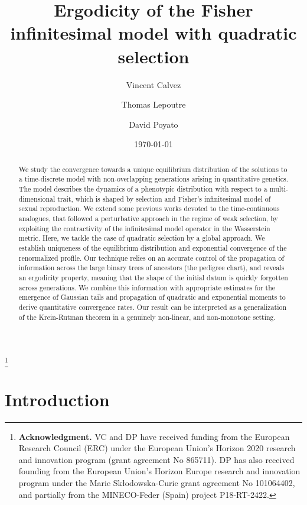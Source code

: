 \documentclass[reqno]{amsart}
\title[Ergodicity of the Fisher infinitesimal model with quadratic selection]{Ergodicity of the Fisher infinitesimal model with quadratic selection}
\author[Vincent Calvez]{Vincent Calvez}
\author[Thomas Lepoutre]{Thomas Lepoutre}
\author[David Poyato]{David Poyato}
\numberwithin{equation}{section}
\begin{document}
\date{\today}


\thanks{\textbf{Acknowledgment.}  VC and DP have received funding from the European Research Council (ERC) under the European Union’s Horizon 2020 research and innovation program (grant agreement No 865711). DP has also received founding from the European Union’s Horizon Europe research and innovation program under the Marie Sk\l odowska-Curie grant agreement No 101064402, and partially from the MINECO-Feder (Spain) project P18-RT-2422.}

\begin{abstract}
We study the convergence towards a unique equilibrium distribution of the solutions to a time-discrete model with non-overlapping generations arising in quantitative genetics. The model describes the dynamics of a phenotypic distribution with respect to a multi-dimensional trait, which is shaped by selection and Fisher's infinitesimal model of sexual reproduction. We extend some previous works devoted to the time-continuous analogues, that followed a  perturbative approach in the regime of weak selection, by exploiting the contractivity of the infinitesimal model operator in the Wasserstein metric. Here, we tackle the case of quadratic selection by a global approach. We establish uniqueness of the equilibrium distribution and exponential convergence of the renormalized profile. Our technique relies on an accurate control of the propagation of information across the large binary trees of ancestors (the pedigree chart), and reveals an ergodicity property, meaning that the shape of the initial datum is quickly forgotten across generations. We combine this information with appropriate estimates for the emergence of Gaussian tails and propagation of quadratic and exponential moments to derive quantitative convergence rates. Our result can be interpreted as a generalization of the Krein-Rutman theorem in a genuinely non-linear, and non-monotone setting. 
\end{abstract}

\maketitle

\section{Introduction}
\end{document}
